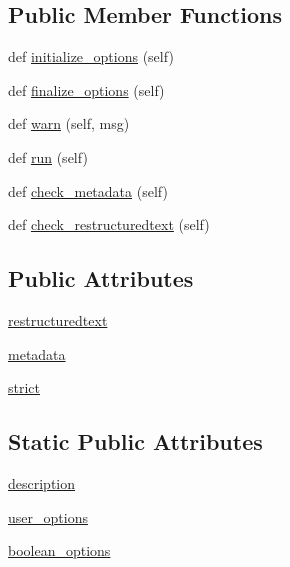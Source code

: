 \subsection*{Public Member Functions}
\begin{DoxyCompactItemize}
\item 
def \hyperlink{classsetuptools_1_1__distutils_1_1command_1_1check_1_1check_abaaee94bb8ebed4bdfd3dd4445efd048}{initialize\+\_\+options} (self)
\item 
def \hyperlink{classsetuptools_1_1__distutils_1_1command_1_1check_1_1check_abd781ba2b58cb8cb5dae93514ab7095a}{finalize\+\_\+options} (self)
\item 
def \hyperlink{classsetuptools_1_1__distutils_1_1command_1_1check_1_1check_a459238fa6e004dd27eb3bfb9979e384e}{warn} (self, msg)
\item 
def \hyperlink{classsetuptools_1_1__distutils_1_1command_1_1check_1_1check_ada1de3784b003fdd704e231ed4dfa934}{run} (self)
\item 
def \hyperlink{classsetuptools_1_1__distutils_1_1command_1_1check_1_1check_ac22c21f54cd3f4730c22f5c6bac293bc}{check\+\_\+metadata} (self)
\item 
def \hyperlink{classsetuptools_1_1__distutils_1_1command_1_1check_1_1check_a7ae9252df82ce237786a24cd289d1a90}{check\+\_\+restructuredtext} (self)
\end{DoxyCompactItemize}
\subsection*{Public Attributes}
\begin{DoxyCompactItemize}
\item 
\hyperlink{classsetuptools_1_1__distutils_1_1command_1_1check_1_1check_ac9218464b1f3aeb765ea0ceee93b33e6}{restructuredtext}
\item 
\hyperlink{classsetuptools_1_1__distutils_1_1command_1_1check_1_1check_ab08724d5d14ef7832df8b318b6ca43aa}{metadata}
\item 
\hyperlink{classsetuptools_1_1__distutils_1_1command_1_1check_1_1check_a6ab773fb7961af5bb94c3352b8199cbb}{strict}
\end{DoxyCompactItemize}
\subsection*{Static Public Attributes}
\begin{DoxyCompactItemize}
\item 
\hyperlink{classsetuptools_1_1__distutils_1_1command_1_1check_1_1check_ab89f7cb21d0c2ca2ca2c6bbb3754f8cf}{description}
\item 
\hyperlink{classsetuptools_1_1__distutils_1_1command_1_1check_1_1check_a430ec980e900b94ebf5a9aeb02f39320}{user\+\_\+options}
\item 
\hyperlink{classsetuptools_1_1__distutils_1_1command_1_1check_1_1check_ad2c53968f99ce4e1d702845357291014}{boolean\+\_\+options}
\end{DoxyCompactItemize}


